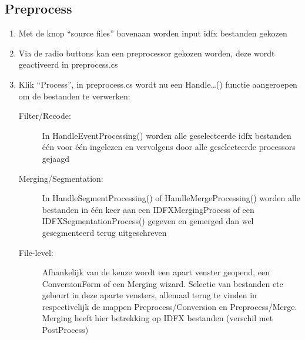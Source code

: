 \documentclass[a4paper,12pt,titlepage]{article}
\begin{document}
\subsection{Preprocess}
\begin{enumerate}
\item Met de knop ``source files'' bovenaan worden input idfx bestanden gekozen
\item Via de radio buttons kan een preprocessor gekozen worden, deze wordt geactiveerd in preprocess.cs
\item Klik ``Process'', in preprocess.cs wordt nu een Handle\ldots() functie aangeroepen om de bestanden te verwerken:
\begin{description}
\item[Filter/Recode:] In HandleEventProcessing() worden alle geselecteerde idfx bestanden \'e\'en voor \'e\'en ingelezen en vervolgens door alle geselecteerde processors gejaagd
\item[Merging/Segmentation:] In HandleSegmentProcessing() of HandleMergeProcessing() worden alle bestanden in \'e\'en keer aan een IDFXMergingProcess of een IDFXSegmentationProcess() gegeven en gemerged dan wel gesegmenteerd terug uitgeschreven
\item[File-level:] Afhankelijk van de keuze wordt een apart venster geopend, een ConversionForm of een Merging wizard. Selectie van bestanden etc gebeurt in deze aparte vensters, allemaal terug te vinden in respectivelijk de mappen Preprocess/Conversion en Preprocess/Merge. Merging heeft hier betrekking op IDFX bestanden (verschil met PostProcess)
\end{description}
\end{enumerate}
\end{document}

